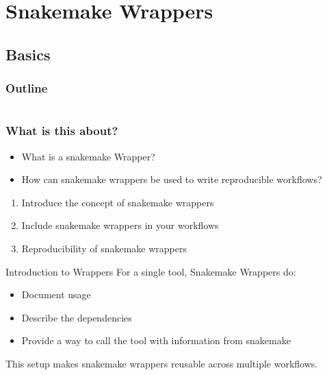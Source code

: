 \section{Snakemake Wrappers}

\subsection*{Basics}

\begin{frame}
    \frametitle{Outline}
    \begin{columns}[t]
        \begin{column}{.5\textwidth}
            \tableofcontents[sections={1-9},currentsection]
        \end{column}
        \begin{column}{.5\textwidth}
            \tableofcontents[sections={10-18},currentsection]
        \end{column}
    \end{columns}
\end{frame}

\begin{frame}
    \frametitle{What is this about?}
    \begin{question}[Questions]
        \begin{itemize}
            \item What is a snakemake Wrapper?
            \item How can snakemake wrappers be used to write reproducible workflows?
        \end{itemize}
    \end{question}
    \begin{docs}[Objectives]
        \begin{enumerate}
            \item Introduce the concept of snakemake wrappers
            \item Include snakemake wrappers in your workflows
            \item Reproducibility of snakemake wrappers
        \end{enumerate}
    \end{docs}
\end{frame}

\begin{frame}{Introduction to Wrappers}
    For a single tool, Snakemake Wrappers do:
    \begin{itemize}[<+->]
        \item Document usage
        \item Describe the dependencies
        \item Provide a way to call the tool with information from snakemake
    \end{itemize}
    This setup makes snakemake wrappers reusable across multiple workflows.
\end{frame}

